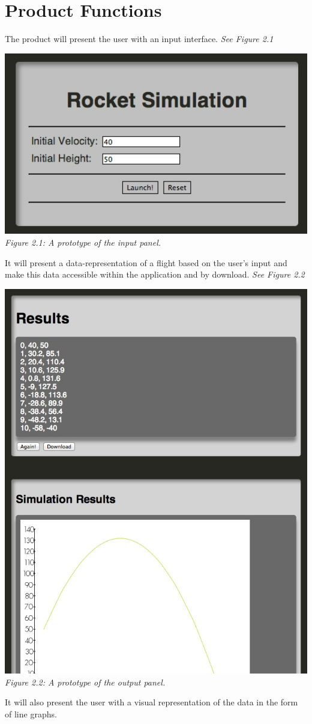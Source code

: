 \documentclass{report}
\begin{document}
	\section{Product Functions}
		The product will present the user with an input interface. \textit{See Figure 2.1}\\
		\begin{centering}
			\includegraphics[width=1\textwidth]{Input.jpeg}\\
			\textit{Figure 2.1: A prototype of the input panel.}\\
		\end{centering}
		It will present a data-representation of a flight based on the user's input and make this data accessible within the application and by download. \textit{See Figure 2.2}\\
		\begin{centering}
			\includegraphics[width=.5\textwidth]{Output.jpeg}\\
			\textit{Figure 2.2: A prototype of the output panel.}\\
		\end{centering}
		It will also present the user with a visual representation of the data in the form of line graphs.
\end{document}
